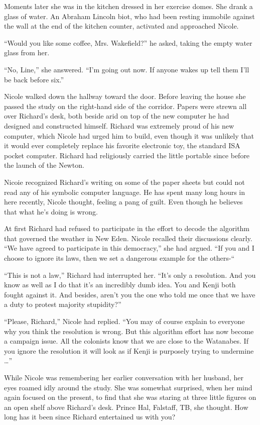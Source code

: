 \documentclass[]{article}
\begin{document}
{Moments later she was in the kitchen dressed in her exercise domes. She drank a glass of water. An Abraham Lincoln biot, who had been resting immobile against the wall at the end of the kitchen counter, activated and approached Nicole.

“Would you like some coffee, Mrs. Wakefield?” he asked, taking the empty water glass from her.

“No, Line,” she answered. “I’m going out now. If anyone wakes up tell them I’ll be back before six.”

Nicole walked down the hallway toward the door. Before leaving the house she passed the study on the right-hand side of the corridor. Papers were strewn all over Richard’s desk, both beside arid on top of the new computer he had designed and constructed himself. Richard was extremely proud of his new computer, which Nicole had urged him to build, even though it was unlikely that it would ever completely replace his favorite electronic toy, the standard ISA pocket computer. Richard had religiously carried the little portable since before the launch of the Newton.

Nicoie recognized Richard’s writing on some of the paper sheets but could not read any of his symbolic computer language. He has spent many long hours in here recently, Nicole thought, feeling a pang of guilt. Even though he believes that what he’s doing is wrong.

At first Richard had refused to participate in the effort to decode the algorithm that governed the weather in New Eden. Nicole recalled their discussions clearly. “We have agreed to participate in this democracy,” she had argued. “If you and I choose to ignore its laws, then we set a dangerous example for the others-“

“This is not a law,” Richard had interrupted her. “It’s only a resolution. And you know as well as I do that it’s an incredibly dumb idea. You and Kenji both fought against it. And besides, aren’t you the one who told me once that we have a duty to protest majority stupidity?”

“Please, Richard,” Nicole had replied. “You may of course explain to everyone why you think the resolution is wrong. But this algorithm effort has now become a campaign issue. All the colonists know that we are close to the Watanabes. If you ignore the resolution it will look as if Kenji is purposely trying to undermine …”

While Nicole was remembering her earlier conversation with her husband, her eyes roamed idly around the study. She was somewhat surprised, when her mind again focused on the present, to find that she was staring at three little figures on an open shelf above Richard’s desk. Prince Hal, Falstaff, TB, she thought. How long has it been since Richard entertained us with you?

}
\end{document}
